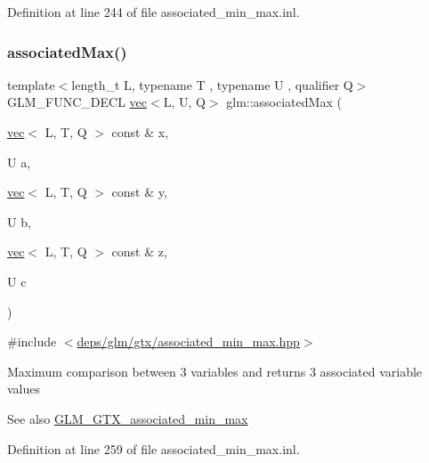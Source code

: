 Definition at line 244 of file associated\+\_\+min\+\_\+max.\+inl.

\mbox{\label{group__gtx__associated__min__max_ga19f59d1141a51a3b2108a9807af78f7f}} 
\subsubsection{\texorpdfstring{associated\+Max()}{associatedMax()}\hspace{0.1cm}{\footnotesize\ttfamily [8/12]}}
{\footnotesize\ttfamily template$<$length\+\_\+t L, typename T , typename U , qualifier Q$>$ \\
G\+L\+M\+\_\+\+F\+U\+N\+C\+\_\+\+D\+E\+CL \hyperlink{structglm_1_1vec}{vec}$<$L, U, Q$>$ glm\+::associated\+Max (\begin{DoxyParamCaption}\item[{\hyperlink{structglm_1_1vec}{vec}$<$ L, T, Q $>$ const \&}]{x,  }\item[{U}]{a,  }\item[{\hyperlink{structglm_1_1vec}{vec}$<$ L, T, Q $>$ const \&}]{y,  }\item[{U}]{b,  }\item[{\hyperlink{structglm_1_1vec}{vec}$<$ L, T, Q $>$ const \&}]{z,  }\item[{U}]{c }\end{DoxyParamCaption})}



{\ttfamily \#include $<$\hyperlink{associated__min__max_8hpp}{deps/glm/gtx/associated\+\_\+min\+\_\+max.\+hpp}$>$}

Maximum comparison between 3 variables and returns 3 associated variable values \begin{DoxySeeAlso}{See also}
\hyperlink{group__gtx__associated__min__max}{G\+L\+M\+\_\+\+G\+T\+X\+\_\+associated\+\_\+min\+\_\+max} 
\end{DoxySeeAlso}


Definition at line 259 of file associated\+\_\+min\+\_\+max.\+inl.

\mbox{\label{group__gtx__associated__min__max_ga3038ffcb43eaa6af75897a99a5047ccc}} 
